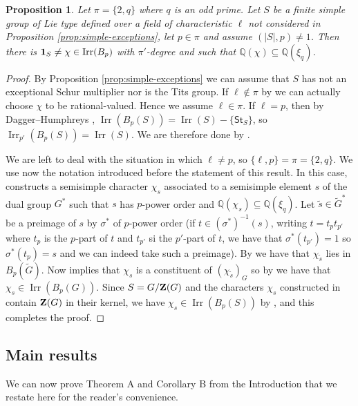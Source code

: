 \documentclass[a4paper,12pt,leqno]{amsart}
\def\zent#1{{\bf Z}(#1)}
\def\sbs{\subseteq}
\newcommand{\6}{^}
\newcommand{\Irr}{\operatorname{Irr}}
\newtheorem{prop}[subsection]{Proposition}
\theoremstyle{definition}
\theoremstyle{definition}
\theoremstyle{definition}
\theoremstyle{definition}
\theoremstyle{definition}
\begin{document}
 
 \begin{prop}\label{prop: lie type} Let $\pi=\{ 2, q\}$ where $q$ is an odd prime.
 Let $S$ be a finite simple group of Lie type defined over a field of characteristic $\ell$ not considered in Proposition \ref{prop:simple-exceptions}, let $p\in\pi$  and assume $(|S|,p)\neq 1$. Then there is ${\bf 1}_S\neq \chi\in\Irr(B_p)$ with $\pi'$-degree and such that $\mathbb{Q}(\chi)\sbs \mathbb{Q}(\xi_q)$.
 \end{prop}
 \begin{proof} By Proposition \ref{prop:simple-exceptions} we can assume that $S$ has not an exceptional Schur multiplier nor is the Tits group. If $\ell \notin \pi$ by \cite[Proposition 3.7]{NRS22} we can actually choose $\chi$ to be rational-valued. Hence we assume $\ell\in \pi$. If $\ell=p$, then by Dagger--Humphreys \cite[Theorem 3.3]{Cab18}, $\Irr(B_p(S))=\Irr(S)-\{\mathsf{St}_S\}$,
so $\Irr_{p'}(B_p(S))=\Irr(S)$. We are therefore done  by \cite[Proposition 4.5]{GHSV21}.

We are left to deal with the situation in which $\ell\neq p$, so  $\{ \ell, p\}=\pi=\{ 2, q \}$. We use now the notation introduced before the statement of this result. In this case, \cite[Proposition 4.5]{GHSV21} constructs a semisimple character $\chi_s$ associated to a semisimple element $s$ of the dual group $G^*$ such that $s$ has $p$-power order and $\mathbb{Q}(\chi_s)\sbs\mathbb{Q}(\xi_q)$. Let $\widetilde{s}\in\widetilde{G}^*$ be a preimage of $s$ by $\sigma^*$ of $p$-power order (if $t\in(\sigma^*)^{-1}(s)$, writing $t=t_pt_{p'}$ where $t_p$ is the $p$-part of $t$ and $t_{p'}$ si the $p'$-part of $t$, we have that $\sigma^*(t_{p'})=1$ so $\sigma^*(t_p)=s$ and we can indeed take such a preimage). By \cite[Corollary 3.4]{Hiss90} we have that $\chi_{\widetilde{s}}$ lies in $B_p(\widetilde{G})$. Now \cite[Proposition 15.6]{CabEng} implies that $\chi_s$ is a constituent of $(\chi_{\widetilde{s}})_{G}$ so by \cite[Theorem 9.2]{Nav98} we have that $\chi_s\in\Irr(B_p(G))$.
Since $S=G/\zent G$ and the characters $\chi_s$ constructed in \cite[Proposition 4.5]{GHSV21} contain $\zent G$ in their kernel, we have $\chi_s\in\Irr(B_p(S))$ by \cite[Lemma 17.2]{CabEng}, and this completes the proof.
 \end{proof}

\subsection{Main results}

We can now prove Theorem A and Corollary B from the Introduction that we restate here for the reader's convenience. 
\end{document}
